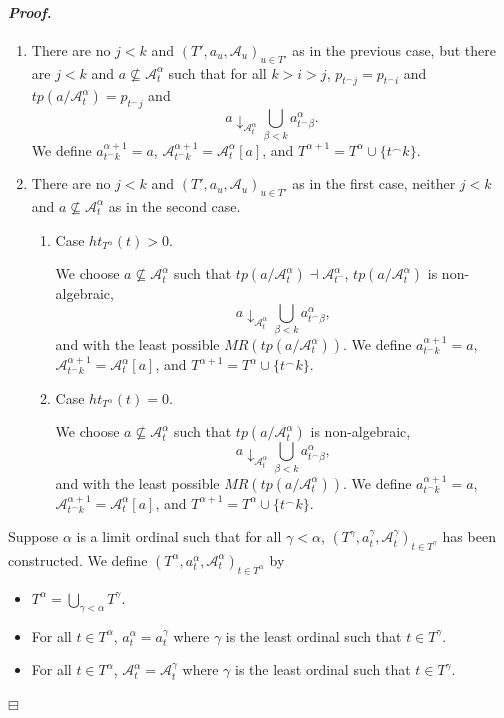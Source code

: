 \documentclass[12pt,a4paper]{amsart}
\theoremstyle{definition}
\theoremstyle{remark}
\newenvironment{cproof}{\paragraph{\emph{Proof.\,}}}{\hfill{$\boxminus$}\par\vspace{2mm}}
\begin{document}
\begin{cproof}
\begin{enumerate}
        \item There are no $j<k$ and $(T', a_u, \mathcal{A}_u)_{u\in T'}$ as in the previous case, but there are $j<k$ and $a\not \subseteq \mathcal{A}^\alpha_t$ such that for all $k>i>j$, $p_{t^\frown j}= p_{t^\frown i}$ and $tp(a / \mathcal{A}^{\alpha}_{t})=p_{t^\frown j}$ and $$a\downarrow_{\mathcal{A}^\alpha_t} \bigcup_{\beta<k}a^\alpha_{t^\frown \beta}.$$ 
        We define $a_{t^\frown k}^{\alpha+1}=a$, $\mathcal{A}^{\alpha+1}_{t^\frown k}=\mathcal{A}^\alpha_{t}[a]$, and $T^{\alpha+1}=T^\alpha\cup \{t^\frown k\}$.
        
        \item There are no $j<k$ and $(T', a_u, \mathcal{A}_u)_{u\in T'}$ as in the first case, neither $j<k$ and $a\not \subseteq \mathcal{A}^\alpha_t$ as in the second case. 
        \begin{enumerate}
            \item Case $ht_{T^\alpha}(t)>0$. 

            We choose $a\not \subseteq \mathcal{A}^\alpha_t$ such that $tp(a / \mathcal{A}^\alpha_{t})\dashv \mathcal{A}^\alpha_{t^{-}}$, $tp(a / \mathcal{A}^\alpha_{t})$ is non-algebraic, $$a\downarrow_{\mathcal{A}^\alpha_t} \bigcup_{\beta<k}a^\alpha_{t^\frown \beta},$$ and with the least possible $MR(tp(a/\mathcal{A}^\alpha_{t}))$. We define $a_{t^\frown k}^{\alpha+1}=a$, $\mathcal{A}^{\alpha+1}_{t^\frown k}=\mathcal{A}^\alpha_{t}[a]$, and $T^{\alpha+1}=T^\alpha\cup \{t^\frown k\}$.

            \item Case $ht_{T^\alpha}(t)=0$.

            We choose $a\not \subseteq \mathcal{A}^\alpha_t$ such that $tp(a / \mathcal{A}^\alpha_{t})$ is non-algebraic, $$a\downarrow_{\mathcal{A}^\alpha_t} \bigcup_{\beta<k}a^\alpha_{t^\frown \beta},$$ and with the least possible $MR(tp(a/\mathcal{A}^\alpha_{t}))$. We define $a_{t^\frown k}^{\alpha+1}=a$, $\mathcal{A}^{\alpha+1}_{t^\frown k}=\mathcal{A}^\alpha_{t}[a]$, and $T^{\alpha+1}=T^\alpha\cup \{t^\frown k\}$.
        \end{enumerate}
        
    \end{enumerate}

    Suppose  $\alpha$ is a limit ordinal such that for all $\gamma<\alpha$, $(T^\gamma, a_t^\gamma, \mathcal{A}_t^\gamma)_{t\in T^\gamma}$ has been constructed. We define $(T^\alpha, a_t^\alpha, \mathcal{A}_t^\alpha)_{t\in T^\alpha}$ by 
    \begin{itemize}
        \item $T^\alpha=\bigcup_{\gamma<\alpha}T^\gamma$.
        \item For all $t\in T^\alpha$, $a^\alpha_t=a^\gamma_t$ where $\gamma$ is the least ordinal such that $t\in T^\gamma$. 
        \item For all $t\in T^\alpha$, $\mathcal{A}_t^\alpha=\mathcal{A}_t^\gamma$ where $\gamma$ is the least ordinal such that $t\in T^\gamma$. 
    \end{itemize}
\end{cproof}
\end{document}
